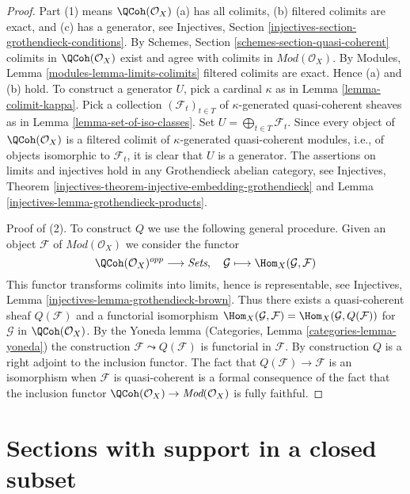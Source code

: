 \begin{proof}
Part (1) means $\QCoh(\mathcal{O}_X)$ (a) has all colimits,
(b) filtered colimits are exact, and (c) has a generator, see
Injectives, Section \ref{injectives-section-grothendieck-conditions}.
By Schemes, Section \ref{schemes-section-quasi-coherent}
colimits in $\QCoh(\mathcal{O}_X)$ exist and agree
with colimits in $\textit{Mod}(\mathcal{O}_X)$. By
Modules, Lemma \ref{modules-lemma-limits-colimits}
filtered colimits are exact. Hence (a) and (b) hold.
To construct a generator $U$, pick a cardinal $\kappa$ as in
Lemma \ref{lemma-colimit-kappa}. Pick a collection
$(\mathcal{F}_t)_{t \in T}$ of $\kappa$-generated quasi-coherent sheaves as in
Lemma \ref{lemma-set-of-iso-classes}. Set
$U = \bigoplus_{t \in T} \mathcal{F}_t$. Since every object of
$\QCoh(\mathcal{O}_X)$ is a filtered colimit of $\kappa$-generated
quasi-coherent modules, i.e., of objects isomorphic to $\mathcal{F}_t$,
it is clear that $U$ is a generator.
The assertions on limits and injectives hold in any
Grothendieck abelian category, see
Injectives, Theorem
\ref{injectives-theorem-injective-embedding-grothendieck} and
Lemma \ref{injectives-lemma-grothendieck-products}.

\medskip\noindent
Proof of (2). To construct $Q$ we use the following general procedure.
Given an object $\mathcal{F}$ of $\textit{Mod}(\mathcal{O}_X)$
we consider the functor
$$
\QCoh(\mathcal{O}_X)^{opp} \longrightarrow \textit{Sets},\quad
\mathcal{G} \longmapsto \Hom_X(\mathcal{G}, \mathcal{F})
$$
This functor transforms colimits into limits,
hence is representable, see
Injectives, Lemma \ref{injectives-lemma-grothendieck-brown}.
Thus there exists a quasi-coherent sheaf $Q(\mathcal{F})$
and a functorial isomorphism
$\Hom_X(\mathcal{G}, \mathcal{F}) = \Hom_X(\mathcal{G}, Q(\mathcal{F}))$
for $\mathcal{G}$ in $\QCoh(\mathcal{O}_X)$. By the Yoneda lemma
(Categories, Lemma \ref{categories-lemma-yoneda})
the construction $\mathcal{F} \leadsto Q(\mathcal{F})$ is
functorial in $\mathcal{F}$. By construction $Q$ is a right
adjoint to the inclusion functor.
The fact that $Q(\mathcal{F}) \to \mathcal{F}$ is an isomorphism
when $\mathcal{F}$ is quasi-coherent is a formal consequence of the fact
that the inclusion functor
$\QCoh(\mathcal{O}_X) \to \textit{Mod}(\mathcal{O}_X)$
is fully faithful.
\end{proof}







\section{Sections with support in a closed subset}
\label{section-sections-with-support-in-closed}

